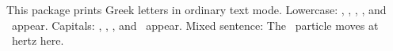 \documentclass{article}
\begin{document}
This package prints Greek letters in ordinary text mode.
Lowercase: \textalpha, \textbeta, \textgamma, \textdelta, and \textomega\ appear.
Capitals: \textAlpha, \textBeta, \textGamma, and \textOmega\ appear.
Mixed sentence: The \textmu\ particle moves at \textnu\ hertz here.
\end{document}
